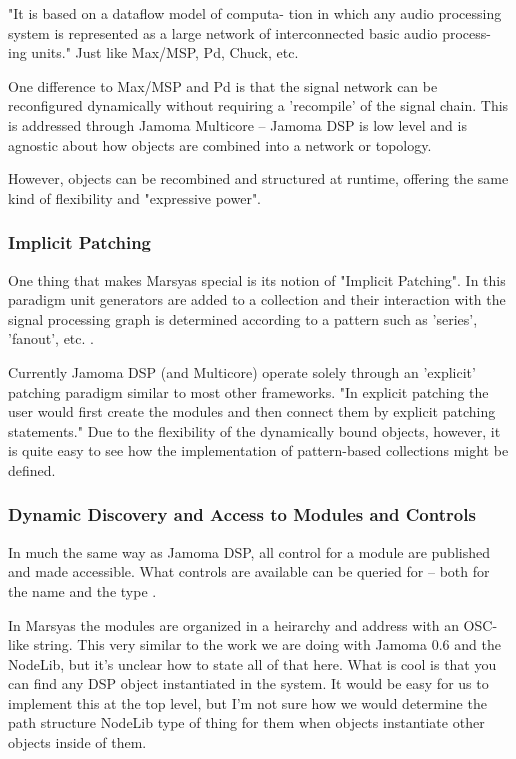 \documentclass[twoside,10pt]{article}
\begin{document}
"It is based on a dataflow model of computa- tion in which any audio processing system is represented as a large network of interconnected basic audio process- ing units."  Just like Max/MSP, Pd, Chuck, etc.

One difference to Max/MSP and Pd is that the signal network can be reconfigured dynamically without requiring a 'recompile' of the signal chain.  This is addressed through Jamoma Multicore -- Jamoma DSP is low level and is agnostic about how objects are combined into a network or topology.

However, objects can be recombined and structured at runtime, offering the same kind of flexibility and "expressive power".

\subsubsection{Implicit Patching}

One thing that makes Marsyas special is its notion of "Implicit Patching".  In this paradigm unit generators are added to a collection and their interaction with the signal processing graph is determined according to a pattern such as 'series', 'fanout', etc. \cite{Bray:2005}.

Currently Jamoma DSP (and Multicore) operate solely through an 'explicit' patching paradigm similar to most other frameworks.  "In explicit patching the user would first create the modules and then connect them by explicit patching statements."  Due to the flexibility of the dynamically bound objects, however, it is quite easy to see how the implementation of pattern-based collections might be defined.


\subsubsection{Dynamic Discovery and Access to Modules and Controls}

In much the same way as Jamoma DSP, all control for a module are published and made accessible.  What controls are available can be queried for -- both for the name and the type  \cite{Tzanetakis:2006}.  

In Marsyas the modules are organized in a heirarchy and address with an OSC-like string.  This very similar to the work we are doing with Jamoma 0.6 and the NodeLib, but it's unclear how to state all of that here.  What is cool is that you can find any DSP object instantiated in the system.  It would be easy for us to implement this at the top level, but I'm not sure how we would determine the path structure NodeLib type of thing for them when objects instantiate other objects inside of them.
\end{document}
